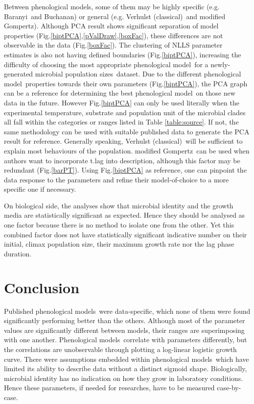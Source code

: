 \documentclass[a4paper, 11pt]{article}
\newcommand{\pml}{phenological model}
\newcommand{\pms}{phenological models}
\newcommand{\Pms}{Phenological models}
\newcommand{\fve}{Verhulst (classical)}
\newcommand{\fgo}{modified Gompertz}
\newcommand{\fba}{Baranyi}
\newcommand{\fbu}{Buchanan}
\newcommand{\pps}{population sizes}
\begin{document}
	Between \pms, some of them may be highly specific (e.g. \fba\ and \fbu) or general (e.g. \fve\ and \fgo).  Although PCA result shows significant separation of model properties (Fig.\ref{biptPCA},\ref{pValDraw},\ref{boxFac}), these differences are not observable in the data (Fig.\ref{boxFac}).  The clustering of NLLS parameter estimates is also not having defined boundaries (Fig.\ref{biptPCA}), increasing the difficulty of choosing the most appropriate \pml\ for a newly-generated microbial \pps\ dataset.  Due to the different \pml\ properties towards their own parameters (Fig.\ref{biptPCA}), the PCA graph can be a reference for determining the best \pml\ on those new data in the future.  However Fig.\ref{biptPCA} can only be used literally when the experimental temperature, substrate and population unit of the microbial clades all fall within the categories or ranges listed in Table \ref{table:source}.  If not, the same methodology can be used with suitable published data to generate the PCA result for reference.  Generally speaking, \fve\ will be sufficient to explain most behaviours of the population.  \fgo\ can be used when authors want to incorporate t.lag into description, although this factor may be redundant (Fig.\ref{barPT}).  Using Fig.\ref{biptPCA} as reference, one can pinpoint the data response to the parameters and refine their model-of-choice to a more specific one if necessary.
	
	On biological side, the analyses show that microbial identity and the growth media are statistically significant as expected.  Hence they should be analysed as one factor because there is no method to isolate one from the other.  Yet this combined factor does not have statistically significant indicative number on their initial, climax population size, their maximum growth rate nor the lag phase duration.
	
	\section*{Conclusion}
	Published \pms\ were data-specific, which none of them were found significantly performing better than the others.  Although most of the parameter values are significantly different between models, their ranges are superimposing with one another.  \Pms\ correlate with parameters differently, but the correlations are unobservable through plotting a log-linear logistic growth curve.  There were assumptions embedded within \pms\ which have limited its ability to describe data without a distinct sigmoid shape.  Biologically, microbial identity has no indication on how they grow in laboratory conditions.  Hence these parameters, if needed for researches, have to be measured case-by-case.
	
\end{document}

